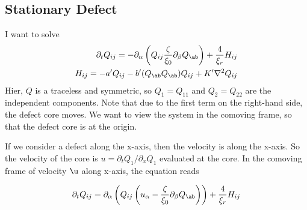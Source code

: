 \subsection{Stationary Defect}
I want to solve
\begin{align}
    \partial_t Q_{ij} = -\partial_\alpha \left( Q_{ij} \frac{\zeta}{\xi_0}\partial_\beta Q_\ab \right) + \frac{4}{\xi_r} H_{ij}
    \\
    H_{ij} = -a' Q_{ij} - b' (Q_\ab Q_\ab) Q_{ij} + K' \nabla^2 Q_{ij}
\end{align}
Hier, $Q$ is a traceless and symmetric, so $Q_1 = Q_{11}$ and $Q_2 = Q_{22}$ are the independent components.
Note that due to the first term on the right-hand side, the defect core moves. We want to view the system in the comoving frame, so that the defect core is at the origin.

If we consider a defect along the x-axis, then the velocity is along the x-axis. So the velocity of the core is $u=\partial_t Q_1 / \partial_x Q_1$ evaluated at the core. In the comoving frame of velocity $\u$ along x-axis, the equation reads


\begin{align}
    \partial_t Q_{ij} = \partial_\alpha \left( Q_{ij} \left(u_\alpha - \frac{\zeta}{\xi_0}\partial_\beta Q_\ab \right) \right) + \frac{4}{\xi_r} H_{ij}
\end{align}


